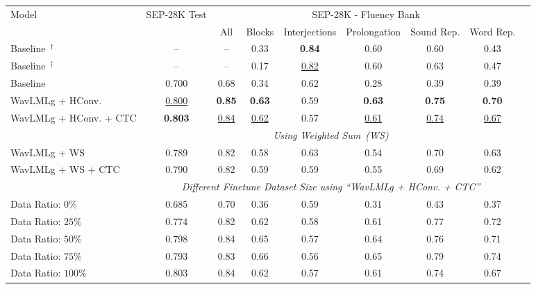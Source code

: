 \begin{table}
\vspace{-10pt}
\centering
\begin{tabular}{lcccccccc}
\toprule
\multirow{2}{*}{Model} & \multirow{2}{*}{SEP-28K Test}  & \multicolumn{6}{c}{SEP-28K - Fluency Bank} \\
\cmidrule{3-8}
 &   & All	& Blocks & Interjections & Prolongation & Sound Rep. & Word Rep.\\
\midrule
Baseline~\cite{bayerl22b_interspeech}$^\dagger$ & -- &
 --   & 0.33 &	\textbf{0.84} &	0.60 &	0.60 &	0.43 \\
Baseline~\cite{bayerl23_interspeech}$^\dagger$ & -- &
 --     & 0.17 & \underline{0.82} & 0.60 & 0.63 & 0.47 \\
\midrule
Baseline~\cite{harvill22_interspeech} & 0.700 &
0.68 &	0.34 &	0.62 &	0.28 &	0.39 &	0.39 \\

WavLMLg + HConv. & \underline{0.800} &	\textbf{0.85} &	\textbf{0.63} &	0.59 &	\textbf{0.63} &	\textbf{0.75} &	\textbf{0.70} \\
WavLMLg + HConv. + CTC & \textbf{0.803} &	\underline{0.84} &	\underline{0.62} &	0.57 &	\underline{0.61} &	\underline{0.74} &	\underline{0.67} \\


\midrule
 & \multicolumn{7}{c}{\textit{Using Weighted Sum~(WS)}} \\
 \cmidrule(lr){2-8}
WavLMLg + WS & 0.789 &	0.82 &	0.58 &	0.63 &	0.54 &	0.70 &	0.63 \\
WavLMLg + WS + CTC & 0.790 &	0.82 &	0.59 &	0.59 &	0.55 &	0.69 &	0.62 \\

\midrule
 & \multicolumn{7}{c}{\textit{Different Finetune Dataset Size using ``WavLMLg + HConv. + CTC''}} \\
\cmidrule(lr){2-8}
Data Ratio: $0\%$ &
0.685 &	0.70 &	0.36 &	0.59 &	0.31 &	0.43 &	0.37 \\
Data Ratio: $25\%$ &
0.774 &	0.82 &	0.62 &	0.58 &	0.61 &	0.77 &	0.72 \\
Data Ratio: $50\%$ &
0.798 &	0.84 &	0.65 &	0.57 &	0.64 &	0.76 &	0.71 \\
Data Ratio: $75\%$ &
0.793 &	0.83 &	0.66 &	0.56 &	0.65 &	0.79 &	0.74 \\
Data Ratio: $100\%$ & 0.803 &	0.84 &	0.62 &	0.57 &	0.61 & 0.74 &	0.67 \\









\end{tabular}
\end{table}

